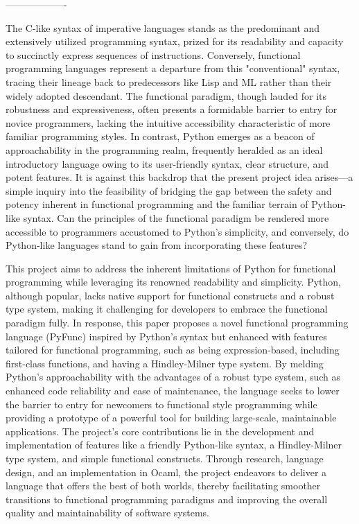 \documentclass{l4proj}
\begin{document}

\begin{center}
    -------------------
\end{center}



The C-like syntax of imperative languages stands as the predominant and extensively utilized programming syntax, prized for its readability and capacity to succinctly express sequences of instructions.
Conversely, functional programming languages represent a departure from this "conventional" syntax, tracing their lineage back to predecessors like Lisp and ML rather than their widely adopted descendant.
The functional paradigm, though lauded for its robustness and expressiveness, often presents a formidable barrier to entry for novice programmers, lacking the intuitive accessibility characteristic of more familiar programming styles.
In contrast, Python emerges as a beacon of approachability in the programming realm, frequently heralded as an ideal introductory language owing to its user-friendly syntax, clear structure, and potent features.
It is against this backdrop that the present project idea arises—a simple inquiry into the feasibility of bridging the gap between the safety and potency inherent in functional programming and the familiar terrain of Python-like syntax.
Can the principles of the functional paradigm be rendered more accessible to programmers accustomed to Python's simplicity, and conversely, do Python-like languages stand to gain from incorporating these features?

This project aims to address the inherent limitations of Python for functional programming while leveraging its renowned readability and simplicity.
Python, although popular, lacks native support for functional constructs and a robust type system, making it challenging for developers to embrace the functional paradigm fully.
In response, this paper proposes a novel functional programming language (PyFunc) inspired by Python's syntax but enhanced with features tailored for functional programming, such as being expression-based, including first-class functions, and having a Hindley-Milner type system.
By melding Python's approachability with the advantages of a robust type system, such as enhanced code reliability and ease of maintenance, the language seeks to lower the barrier to entry for newcomers to functional style programming while providing a prototype of a powerful tool for building large-scale, maintainable applications.
The project's core contributions lie in the development and implementation of features like a friendly Python-like syntax, a Hindley-Milner type system, and simple functional constructs.
Through research, language design, and an implementation in Ocaml, the project endeavors to deliver a language that offers the best of both worlds, thereby facilitating smoother transitions to functional programming paradigms and improving the overall quality and maintainability of software systems.
\end{document}
